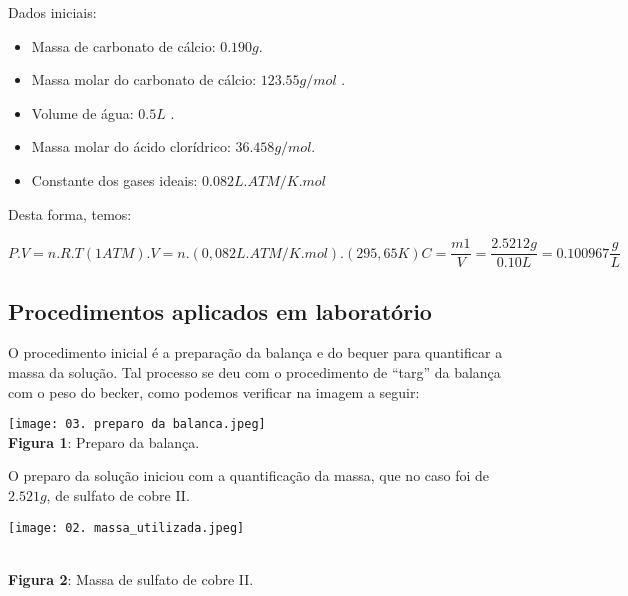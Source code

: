\documentclass[a4paper, 11pt]{article}
\begin{document}
    \indent Dados iniciais:
    \begin{itemize}
        \item Massa de carbonato de cálcio: $0.190g$\@.
        \item Massa molar do carbonato de cálcio: $123.55 g/mol$ \@.
        \item Volume de água: $0.5L$ \@.
        \item Massa molar do ácido clorídrico: $36.458g/mol$\@.
        \item Constante dos gases ideais: $0.082 L.ATM/K.mol$
    \end{itemize}

    \indent Desta forma, temos:
    \begin{center}
        \begin{equation}
            \label{eq:equacao_concentracao}
            P.V = n.R.T

            (1 ATM) . V = n . (0,082 L.ATM/K.mol) . (295,65K)

            C = \frac{m1}{V}
            = \frac{2.5212g}{0.10L}
            = 0.100967\frac{g}{L}

        \end{equation}
    \end{center}

    \subsection{Procedimentos aplicados em laboratório}\label{sec:procedimentos_laboratorio}
    \indent O procedimento inicial é a preparação da balança e do bequer para quantificar a massa da solução\@. Tal processo
    se deu com o procedimento de ``targ'' da balança com o peso do becker, como podemos verificar na imagem a seguir\@: \\
    \begin{center}
        \texttt{[image: 03. preparo da balanca.jpeg]}\\
        \singlespacing
        \textbf{Figura 1}: Preparo da balança\@.
    \end{center}
    \doublespacing

    \indent O preparo da solução iniciou com a quantificação da massa, que no caso foi de $2.521g$, de sulfato de cobre II\@.\\
    \begin{center}
        \parbox{7cm}{\texttt{[image: 02. massa\_utilizada.jpeg]}}\\
        \singlespacing
        \textbf{Figura 2}: Massa de sulfato de cobre II\@.
    \end{center}
    \doublespacing
\end{document}
